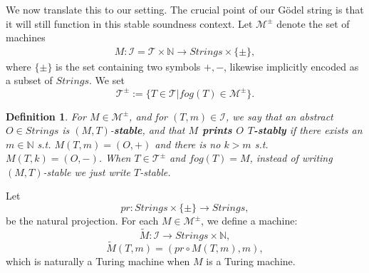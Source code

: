 \documentclass{amsart}  %
\numberwithin{equation}{section}
\newtheorem{definition}[equation]{Definition}
\theoremstyle{definition}
\newtheorem{notation}{Notation}
\theoremstyle{remark}
\begin{document}
{ We now translate this to our setting. The crucial point of our G\"odel string is that it will still function in this stable soundness context.
Let $\mathcal{M} ^{\pm}  $ denote the set of machines
\begin{align*}
{M}: \mathcal{I} = \mathcal{T} \times \mathbb{N} \to Strings \times \{\pm\},
\end{align*}
where $\{\pm\}$ is the set containing two symbols $+,-$, likewise implicitly encoded as a subset of $Strings$.
We set $$\mathcal{T}  ^{\pm} := \{T \in \mathcal{T}| fog (T) \in \mathcal{M} ^{\pm} \}.
$$  
\begin{definition} 
   For ${M} \in \mathcal{M} ^{\pm}  $, and for $ (T,m) \in \mathcal{I} $, we say that an abstract $O \in Strings$ is $(M,T)$-\textbf{\emph{stable}}, and that \textbf{\emph{$M$ prints $O$ $T$-stably}}  if there exists an $m \in \mathbb{N}$ s.t.  ${M} (T,m) = (O, +) $ and there is no $k>m$ s.t. $M (T,k) = (O,-)$.  When $T \in \mathcal{T} ^{\pm} $  and $fog (T)=M$, instead of writing $(M,T)$-stable we just write $T$-stable.
\end{definition}
Let $$pr: Strings \times \{\pm\} \to  Strings,$$ be the natural projection.
For each $M \in \mathcal{M} ^{\pm} $, we define a machine: 
%
%
$$\widetilde{M}: \mathcal{I} \to Strings \times \mathbb{N},    $$ 
\begin{equation} \label{eq:S0D}
   \widetilde{M}   (T,m) = (pr \circ M (T,m),m),
\end{equation}
which is naturally a Turing machine when $M$ is a Turing machine. 

}
\end{document}
